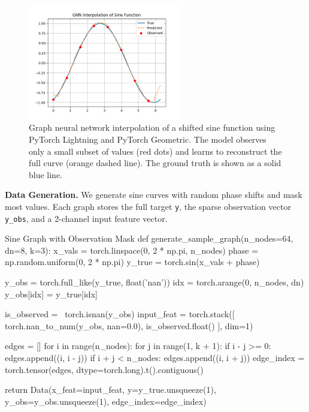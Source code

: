 %
\begin{figure}[ht]
    \centering
    \includegraphics[width=0.6\textwidth]{images/lightning_demo.png}
    \caption{%
        Graph neural network interpolation of a shifted sine function using PyTorch Lightning and PyTorch Geometric.
        The model observes only a small subset of values (red dots) and learns to reconstruct the full curve (orange dashed line).
        The ground truth is shown as a solid blue line.
    }
    \label{fig:gnn-sine-interpolation}
\end{figure}

%
{\bf Data Generation.} We generate sine curves with random phase shifts and mask most values. Each graph stores the full target \texttt{y}, the sparse observation vector \texttt{y\_obs}, and a 2-channel input feature vector.

\begin{codeonly}{Sine Graph with Observation Mask}
def generate_sample_graph(n_nodes=64, dn=8, k=3):
    x_vals = torch.linspace(0, 2 * np.pi, n_nodes)
    phase = np.random.uniform(0, 2 * np.pi)
    y_true = torch.sin(x_vals + phase)

    y_obs = torch.full_like(y_true, float('nan'))
    idx = torch.arange(0, n_nodes, dn)
    y_obs[idx] = y_true[idx]

    is_observed = ~torch.isnan(y_obs)
    input_feat = torch.stack([
        torch.nan_to_num(y_obs, nan=0.0),
        is_observed.float()
    ], dim=1)

    edges = []
    for i in range(n_nodes):
        for j in range(1, k + 1):
            if i - j >= 0:
                edges.append((i, i - j))
            if i + j < n_nodes:
                edges.append((i, i + j))
    edge_index = torch.tensor(edges, dtype=torch.long).t().contiguous()

    return Data(x_feat=input_feat, y=y_true.unsqueeze(1), y_obs=y_obs.unsqueeze(1), edge_index=edge_index)
\end{codeonly}

